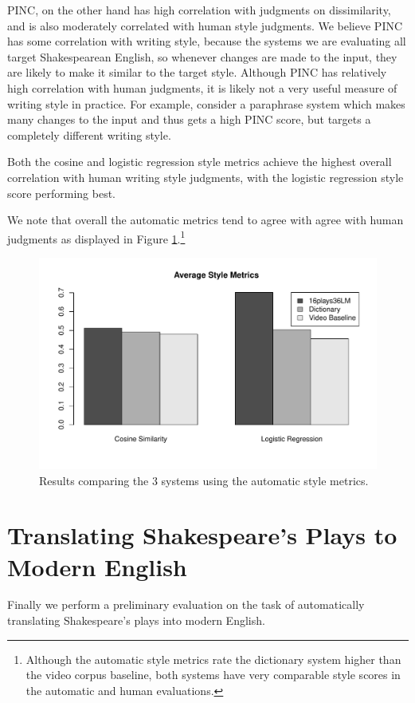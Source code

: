 \documentclass[10pt,a5paper,twoside]{article}
\begin{document}
PINC, on the other hand has high correlation with judgments on dissimilarity, and is also moderately correlated with human style
judgments.  We believe PINC has some correlation with writing style, because the systems we are evaluating all target Shakespearean English, 
so whenever changes are made to the input, they are likely to make it similar to the target style.
Although PINC has relatively high correlation with human judgments, it is likely not a very useful measure of writing style in practice.
For example, consider a paraphrase system which makes many changes to the input and thus gets a high PINC score, but targets a completely different writing style.

Both the cosine and logistic regression style metrics achieve the highest overall correlation with human writing style judgments, with the logistic regression style score performing best.

We note that overall the automatic metrics tend to agree with agree with human judgments as displayed in Figure \ref{style_metrics}.\footnote{
  Although the automatic style metrics rate the dictionary system higher than the video corpus baseline, both systems have very comparable
  style scores in the automatic and human evaluations.
}

\begin{figure}
  \begin{center}
    \includegraphics[width=5in]{figures/style_metrics.pdf}
    \end{center}
    \caption{Results comparing the 3 systems using the automatic style metrics.}
    \label{style_metrics}
\end{figure}

\section{Translating Shakespeare's Plays to Modern English}
Finally we perform a preliminary evaluation on the task of automatically translating Shakespeare's plays into modern English.  
\end{document}
